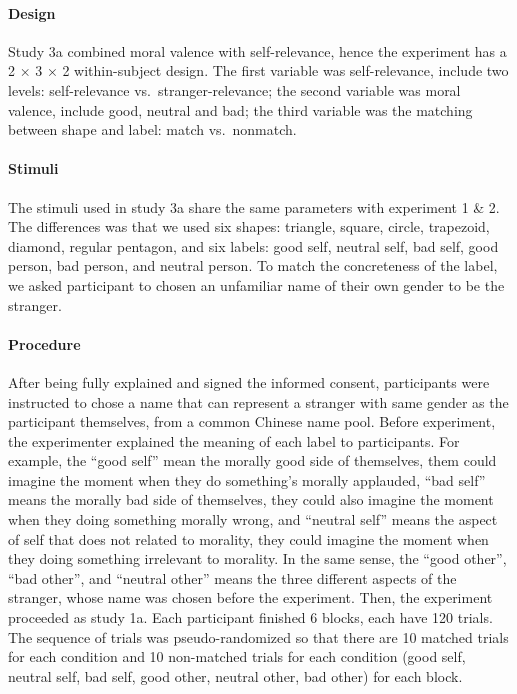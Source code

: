 \documentclass[
  english,
  man]{apa6}
\let\oldparagraph\paragraph
\renewcommand{\paragraph}[1]{\oldparagraph{#1}\mbox{}}
\begin{document}
\hypertarget{design}{%
\paragraph{Design}\label{design}}

Study 3a combined moral valence with self-relevance, hence the experiment has a 2 × 3 × 2 within-subject design. The first variable was self-relevance, include two levels: self-relevance vs.~stranger-relevance; the second variable was moral valence, include good, neutral and bad; the third variable was the matching between shape and label: match vs.~nonmatch.

\hypertarget{stimuli-1}{%
\paragraph{Stimuli}\label{stimuli-1}}

The stimuli used in study 3a share the same parameters with experiment 1 \& 2. The differences was that we used six shapes: triangle, square, circle, trapezoid, diamond, regular pentagon, and six labels: good self, neutral self, bad self, good person, bad person, and neutral person. To match the concreteness of the label, we asked participant to chosen an unfamiliar name of their own gender to be the stranger.

\hypertarget{procedure-5}{%
\paragraph{Procedure}\label{procedure-5}}

After being fully explained and signed the informed consent, participants were instructed to chose a name that can represent a stranger with same gender as the participant themselves, from a common Chinese name pool. Before experiment, the experimenter explained the meaning of each label to participants. For example, the \enquote{good self} mean the morally good side of themselves, them could imagine the moment when they do something's morally applauded, \enquote{bad self} means the morally bad side of themselves, they could also imagine the moment when they doing something morally wrong, and \enquote{neutral self} means the aspect of self that does not related to morality, they could imagine the moment when they doing something irrelevant to morality. In the same sense, the \enquote{good other}, \enquote{bad other}, and \enquote{neutral other} means the three different aspects of the stranger, whose name was chosen before the experiment. Then, the experiment proceeded as study 1a. Each participant finished 6 blocks, each have 120 trials. The sequence of trials was pseudo-randomized so that there are 10 matched trials for each condition and 10 non-matched trials for each condition (good self, neutral self, bad self, good other, neutral other, bad other) for each block.
\end{document}
